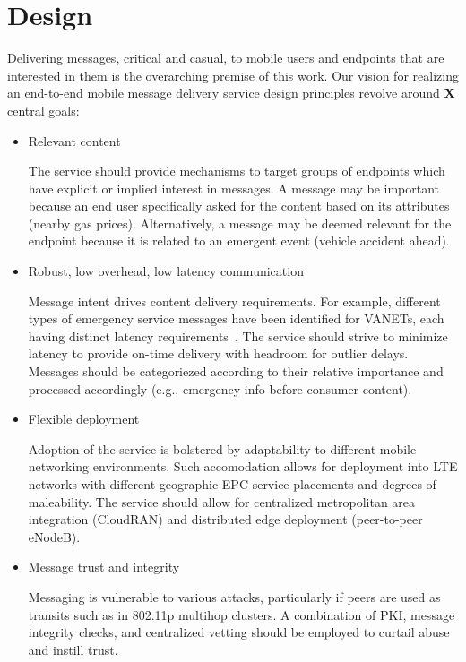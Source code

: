 \section*{Design}

Delivering messages, critical and casual, to mobile users and
endpoints that are interested in them is the overarching premise of
this work. Our vision for realizing an end-to-end mobile message
delivery service design principles revolve around {\bf X} central
goals:

\begin{itemize}
\item Relevant content

The service should provide mechanisms to target groups of endpoints
which have explicit or implied interest in messages. A message may be
important because an end user specifically asked for the content based
on its attributes (nearby gas prices). Alternatively, a message may be
deemed relevant for the endpoint because it is related to an emergent
event (vehicle accident ahead).

\item Robust, low overhead, low latency communication

Message intent drives content delivery requirements.  For example,
different types of emergency service messages have been identified for
VANETs, each having distinct latency
requirements~\cite{vanet-msg-reqs}. The service should strive to
minimize latency to provide on-time delivery with headroom for outlier
delays. Messages should be categoriezed according to their relative
importance and processed accordingly (e.g., emergency info before
consumer content).

\item Flexible deployment

Adoption of the service is bolstered by adaptability to different
mobile networking environments.  Such accomodation allows for
deployment into LTE networks with different geographic EPC service
placements and degrees of maleability.  The service should allow for
centralized metropolitan area integration (CloudRAN) and distributed
edge deployment (peer-to-peer eNodeB).

\item Message trust and integrity

Messaging is vulnerable to various attacks, particularly if peers are
used as transits such as in 802.11p multihop clusters. A combination
of PKI, message integrity checks, and centralized vetting should be
employed to curtail abuse and instill trust.


\end{itemize}
